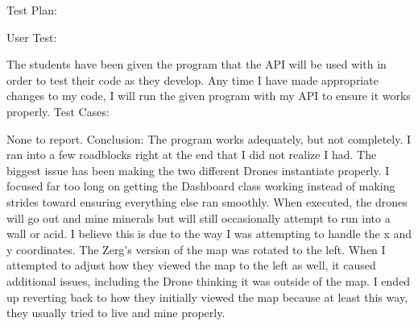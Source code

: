 \documentclass[12pt]{article}
\begin{document}
\begin{flushleft}
Test Plan:
\end{flushleft}
User Test:

The students have been given the program that the API will be used with in order to test their code as they develop.  Any time I have made appropriate changes to my code, I will run the given program with my API to ensure it works properly.
\newline
\newline
Test Cases:

None to report.
\newline
\newline
Conclusion:
The program works adequately, but not completely.  I ran into a few roadblocks right at the end that I did not realize I had.  The biggest issue has been making the two different Drones instantiate properly.  I focused far too long on getting the Dashboard class working instead of making strides toward ensuring everything else ran smoothly.
\newline
\newline
When executed, the drones will go out and mine minerals but will still occasionally attempt to run into a wall or acid.  I believe this is due to the way I was attempting to handle the x and y coordinates.  The Zerg's version of the map was rotated to the left.  When I attempted to adjust how they viewed the map to the left as well, it caused additional issues, including the Drone thinking it was outside of the map.  I ended up reverting back to how they initially viewed the map because at least this way, they usually tried to live and mine properly.
\end{document}
